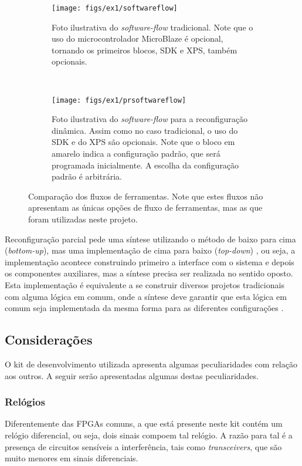 \documentclass[11pt,a4paper,oneside]{book}
\begin{document}
\begin{figure}[h]
	\centering
       	\begin{subfigure}[b]{\textwidth}
       		\centering
		\texttt{[image: figs/ex1/softwareflow]}
		\caption{Foto ilustrativa do \textit{software-flow} tradicional. Note que o uso do microcontrolador MicroBlaze é opcional, tornando os primeiros blocos, SDK e XPS, também opcionais.}
		\label{fig:softwareflow}
	\end{subfigure}\\
	\begin{subfigure}[b]{\textwidth}
		\centering
		\texttt{[image: figs/ex1/prsoftwareflow]}
		\caption{Foto ilustrativa do \textit{software-flow} para a reconfiguração dinâmica. Assim como no caso tradicional, o uso do SDK e do XPS são opcionais. Note que o bloco em amarelo indica a configuração padrão, que será programada inicialmente. A escolha da configuração padrão é arbitrária.}
		\label{fig:prsoftwareflow}
	\end{subfigure}
	\caption{Comparação dos fluxos de ferramentas. Note que estes fluxos não apresentam as únicas opções de fluxo de ferramentas, mas as que foram utilizadas neste projeto.}
	\label{fig:softwareflow:comparacao}
\end{figure}

Reconfiguração parcial pede uma síntese utilizando o método \dlq de baixo para cima\drq{} (\textit{bottom-up}), mas uma implementação \dlq de cima para baixo\drq{} (\textit{top-down}) \cite{ug743}, ou seja, a implementação acontece construindo primeiro a interface com o sistema e depois os componentes auxiliares, mas a síntese precisa ser realizada no sentido oposto.
Esta implementação é equivalente a se construir diversos projetos tradicionais com alguma lógica em comum, onde a síntese deve garantir que esta lógica em comum seja implementada da mesma forma para as diferentes configurações \cite{ug702}.

\subsection{Considerações}
O kit de desenvolvimento utilizada apresenta algumas peculiaridades com relação aos outros.
A seguir serão apresentadas algumas destas peculiaridades.

\subsubsection{Relógios}
Diferentemente das FPGAs comuns, a que está presente neste kit contém um relógio diferencial, ou seja, dois sinais compoem tal relógio.
A razão para tal é a presença de circuitos sensíveis a interferência, tais como \textit{transceivers}, que são muito menores em sinais diferenciais.
\end{document}

